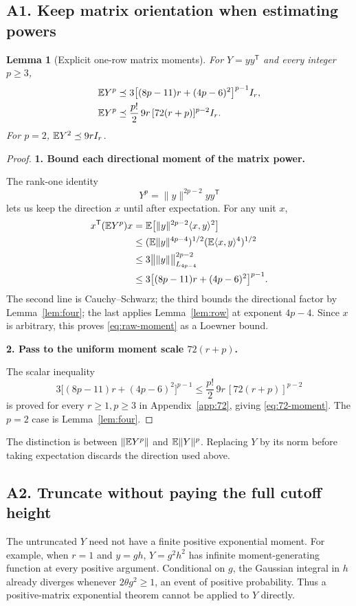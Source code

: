 \documentclass[11pt]{article}
\numberwithin{equation}{section}
\newtheorem{lemma}[theorem]{Lemma}
\theoremstyle{definition}\newtheorem{definition}[theorem]{Definition}
\theoremstyle{remark}\newtheorem{remark}[theorem]{Remark}
\newcommand{\norm}[1]{\lVert#1\rVert}\newcommand{\ip}[2]{\langle#1,#2\rangle}
\newcommand{\step}[1]{\par\addvspace{.65\baselineskip}\Needspace{4\baselineskip}\noindent\textbf{#1}\par\nobreak\smallskip}
\begin{document}
\subsection{A1. Keep matrix orientation when estimating powers}
\begin{lemma}[Explicit one-row matrix moments]\label{lem:raw-moments}
For $Y=yy^{\mathsf T}$ and every integer $p\ge3$,
\begin{align}
 \mathbb E Y^p
 &\preceq 3\bigl[(8p-11)r+(4p-6)^2\bigr]^{p-1}I_r,\label{eq:raw-moment}\\
 \mathbb E Y^p
 &\preceq\frac{p!}{2}\,9r\,[72(r+p)]^{p-2}I_r.\label{eq:72-moment}
\end{align}
For $p=2$, $\mathbb E Y^2\preceq9rI_r$.
\end{lemma}
\begin{proof}
\step{1. Bound each directional moment of the matrix power.}
The rank-one identity
\[
 Y^p=\norm y^{2p-2}yy^{\mathsf T}
\]
lets us keep the direction $x$ until after expectation. For any unit $x$,
\begin{align*}
 x^{\mathsf T}(\E Y^p)x
 &=\E\bigl[\norm y^{2p-2}\ip{x}{y}^2\bigr]\\
 &\le(\E\norm y^{4p-4})^{1/2}(\E\ip{x}{y}^4)^{1/2}\\
 &\le3\bigl\|\norm y\bigr\|_{L_{4p-4}}^{2p-2}\\
 &\le3\bigl[(8p-11)r+(4p-6)^2\bigr]^{p-1}.
\end{align*}
The second line is Cauchy--Schwarz; the third bounds the directional factor by
Lemma~\ref{lem:four}; the last applies Lemma~\ref{lem:row} at exponent $4p-4$.
Since $x$ is arbitrary, this proves \eqref{eq:raw-moment} as a Loewner bound.

\step{2. Pass to the uniform moment scale $72(r+p)$.}
The scalar inequality
\begin{equation}\label{eq:72-scalar}
 3\bigl[(8p-11)r+(4p-6)^2\bigr]^{p-1}
 \le\frac{p!}{2}\,9r\,[72(r+p)]^{p-2}
\end{equation}
is proved for every $r\ge1,p\ge3$ in Appendix~\ref{app:72}, giving
\eqref{eq:72-moment}. The $p=2$ case is Lemma~\ref{lem:four}.
\end{proof}
The distinction is between $\norm{\E Y^p}$ and $\E\norm{Y}^p$.
Replacing $Y$ by its norm before taking expectation discards the direction used above.

\subsection{A2. Truncate without paying the full cutoff height}
The untruncated $Y$ need not have a finite positive exponential moment. For example,
when $r=1$ and $y=gh$, $Y=g^2h^2$ has infinite moment-generating function at every
positive argument. Conditional on $g$, the Gaussian integral in $h$ already diverges
whenever $2\theta g^2\ge1$, an event of positive probability.
Thus a positive-matrix exponential theorem cannot be applied to $Y$ directly.
\end{document}
